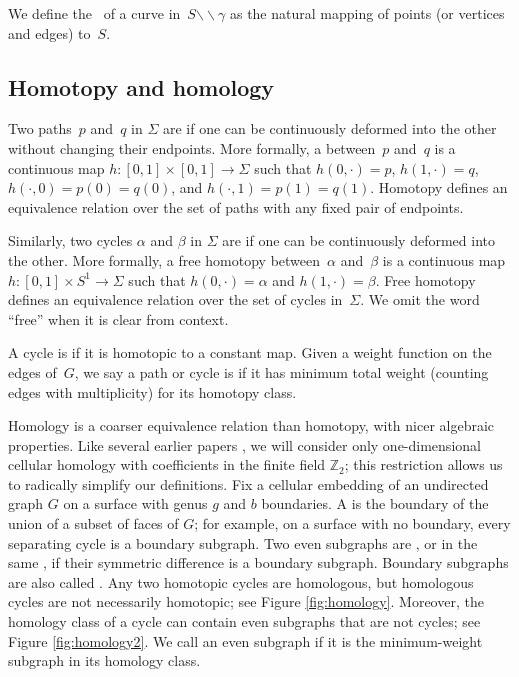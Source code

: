 \documentclass[letterpaper,review]{siamart190516}
\def\Z{\mathbb{Z}}
\def\snip{\mathbin{\raisebox{0.15ex}{\rotatebox[origin=c]{60}{\Rightscissors}\!}}}
\def\snip{\mathbin{\backslash\!\!\backslash}}
\begin{document}
We define the~ of a curve in~$S \snip \gamma$ as the natural mapping of points (or vertices and edges) to~$S$. 


\subsection{Homotopy and homology}
\label{SS:homology}

Two paths~$p$ and~$q$ in $\Sigma$ are  if one can be continuously deformed into the other without changing their endpoints.
More formally, a  between~$p$ and~$q$ is a continuous map $h\colon {[0,1]\times [0,1] \to \Sigma}$ such that $h(0,\cdot) = p$, $h(1,\cdot) = q$, $h(\cdot, 0)=p(0)=q(0)$, and $h(\cdot,1)=p(1)=q(1)$.  Homotopy defines an equivalence relation over the set of paths with any fixed pair of endpoints.

Similarly, two cycles $\alpha$ and $\beta$ in $\Sigma$ are  if one can be
continuously deformed into the other.  More formally, a free homotopy between~$\alpha$ and~$\beta$
is a continuous map $h\colon {[0,1]\times S^1 \to \Sigma}$ such that $h(0,\cdot) = \alpha$ and
$h(1,\cdot) = \beta$.  Free homotopy defines an equivalence relation over the set of cycles
in~$\Sigma$.  We omit the word ``free'' when it is clear from context.

%
%
A cycle is  if it is homotopic to a constant map.
Given a weight function on the edges of~$G$, we say a path or cycle is  if it has minimum total weight (counting edges with multiplicity) for its homotopy class.

Homology is a coarser equivalence relation than homotopy, with nicer
algebraic properties.  Like several earlier papers \cite{cf-qhc2-07,
cf-qhc-08, dls-chtl-07, dlsc-cgaht-08,e-sncds-11,f-sntcd-13}, we will consider only
one-dimensional cellular homology with coefficients in the finite
field $\Z_2$; this restriction allows us to radically simplify our
definitions.
Fix a cellular embedding of an undirected graph $G$ on a surface with genus $g$ and $b$ boundaries.  A  is the boundary of the union of a subset of faces of $G$; for example, on a surface with no boundary, every separating cycle is a boundary subgraph.
Two even subgraphs are , or in the same , if their symmetric difference is a boundary subgraph.
Boundary subgraphs are also called .  Any two homotopic cycles are homologous, but homologous cycles are not necessarily homotopic; see Figure \ref{fig:homology}.  Moreover, the homology class of a cycle can contain even subgraphs that are not cycles; see Figure \ref{fig:homology2}. We call an even subgraph \EMPH{$\Z_2$-minimal} if it is the minimum-weight subgraph in its homology class. 
\end{document}
